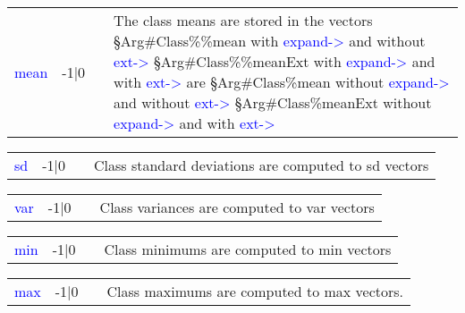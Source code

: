 \vspace{-1.51em}
\begin{table}[H]
\begin{tabular}{ m{}  m{}m{}p{}}
\textcolor{blue}{mean}&-1|0& &The class means are stored in the vectors \newline
 §Arg\#Class\%\%mean with \textcolor{blue}{expand->} and without \textcolor{blue}{ext->}\newline
 §Arg\#Class\%\%meanExt with \textcolor{blue}{expand->} and with \textcolor{blue}{ext->} are \newline
 §Arg\#Class\%mean without \textcolor{blue}{expand->} and without \textcolor{blue}{ext->} \newline
 §Arg\#Class\%meanExt without \textcolor{blue}{expand->} and with \textcolor{blue}{ext->}
\\ \cline{1-4}
\end{tabular}
\end{table}
\vspace{-1.51em}
\begin{table}[H]
\begin{tabular}{ m{}  m{}m{}p{}}
\textcolor{blue}{sd}&-1|0& & Class standard deviations are computed to sd vectors
\\ \cline{1-4}
\end{tabular}
\end{table}
\vspace{-1.51em}
\begin{table}[H]
\begin{tabular}{ m{}  m{}m{}p{}}
\textcolor{blue}{var}&-1|0& & Class variances are computed to var vectors
\\ \cline{1-4}
\end{tabular}
\end{table}
\vspace{-1.51em}
\begin{table}[H]
\begin{tabular}{ m{}  m{}m{}p{}}
\textcolor{blue}{min}&-1|0& & Class minimums are computed to min vectors
\\ \cline{1-4}
\end{tabular}
\end{table}
\vspace{-1.51em}
\begin{table}[H]
\begin{tabular}{ m{}  m{}m{}p{}}
\textcolor{blue}{max}&-1|0& & Class maximums are computed to max vectors.
\\ \cline{1-4}
\end{tabular}
\end{table}
